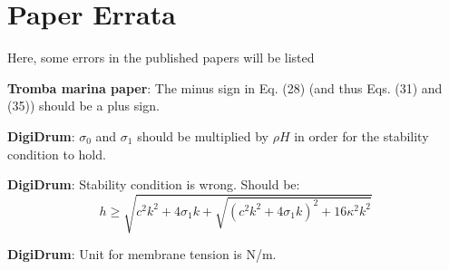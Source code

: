 \chapter{Paper Errata}
Here, some errors in the published papers will be listed

\textbf{Tromba marina paper}: The minus sign in Eq. (28) (and thus Eqs. (31) and (35)) should be a plus sign.

\textbf{DigiDrum}: $\sigma_0$ and $\sigma_1$ should be multiplied by $\rho H$ in order for the stability condition to hold.

\textbf{DigiDrum}: Stability condition is wrong. Should be: 
\begin{equation}
    h \geq \sqrt{c^2k^2 + 4\sigma_1k + \sqrt{(c^2k^2+4\sigma_1k)^2 + 16\kappa^2k^2}}
\end{equation}

\textbf{DigiDrum}: Unit for membrane tension is N/m.